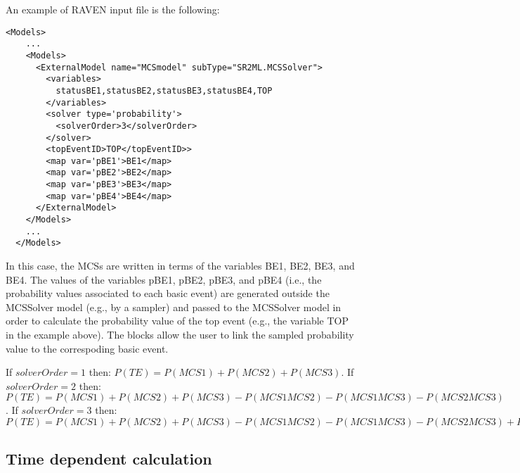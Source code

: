 An example of RAVEN input file is the following:

\begin{lstlisting}[style=XML,morekeywords={anAttribute},caption=MCSSolver model input example., label=lst:MCSSolver_InputExample]
  <Models>
    ...
    <Models>
      <ExternalModel name="MCSmodel" subType="SR2ML.MCSSolver">
        <variables>
          statusBE1,statusBE2,statusBE3,statusBE4,TOP
        </variables>
        <solver type='probability'>
          <solverOrder>3</solverOrder>
        </solver>
        <topEventID>TOP</topEventID>>
        <map var='pBE1'>BE1</map>
        <map var='pBE2'>BE2</map>
        <map var='pBE3'>BE3</map>
        <map var='pBE4'>BE4</map>
      </ExternalModel>
    </Models>
    ...
  </Models>
\end{lstlisting}

In this case, the MCSs are written in terms of the variables BE1, BE2, BE3, and BE4.
The values of the variables pBE1, pBE2, pBE3, and pBE4 (i.e., the probability values associated to each basic event) are
generated outside the MCSSolver model (e.g., by a sampler) and passed to the MCSSolver model in order to calculate the
probability value of the top event (e.g., the variable TOP in the example above).
The  blocks allow the user to link the sampled probability value to the correspoding basic event.

If $solverOrder=1$ then: $P(TE) = P(MCS1)+P(MCS2)+P(MCS3)$.
If $solverOrder=2$ then: $P(TE) = P(MCS1)+P(MCS2)+P(MCS3) - P(MCS1 MCS2) - P(MCS1 MCS3) - P(MCS2 MCS3)$.
If $solverOrder=3$ then: $P(TE) = P(MCS1)+P(MCS2)+P(MCS3) - P(MCS1 MCS2) - P(MCS1 MCS3) - P(MCS2 MCS3) + P(MCS1 MCS2 MCS3)$

\subsection{Time dependent calculation}

